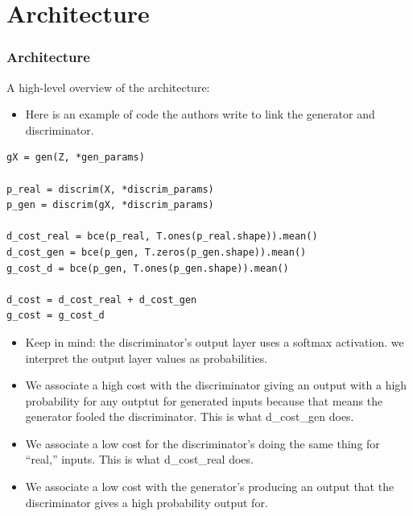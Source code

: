 \documentclass{beamer}
\begin{document}
\section{Architecture}
\begin{frame}[fragile]
\frametitle{Architecture}
A high-level overview of the architecture:
\begin{itemize}
\item Here is an example of code the authors write to link the generator and
  discriminator.  
\end{itemize}
\begin{tiny}
\begin{lstlisting}
gX = gen(Z, *gen_params)

p_real = discrim(X, *discrim_params)
p_gen = discrim(gX, *discrim_params)

d_cost_real = bce(p_real, T.ones(p_real.shape)).mean()
d_cost_gen = bce(p_gen, T.zeros(p_gen.shape)).mean()
g_cost_d = bce(p_gen, T.ones(p_gen.shape)).mean()

d_cost = d_cost_real + d_cost_gen
g_cost = g_cost_d
\end{lstlisting}
\end{tiny}
\begin{footnotesize}
\begin{itemize}
\item Keep in mind: the discriminator's output layer uses a softmax activation.
  we interpret the output layer values as probabilities.

\item  We associate a high cost with the discriminator giving an output
with a high probability for any outptut for generated inputs because that means
the generator fooled the discriminator.  This is what d\_cost\_gen does.

\item We associate a low cost for the discriminator's doing the same thing for
``real,'' inputs.  This is what d\_cost\_real does.

\item We associate a low cost with the generator's producing an output that the 
  discriminator gives a high probability output for.

\end{itemize}
\end{footnotesize}
\end{frame}
\end{document}
